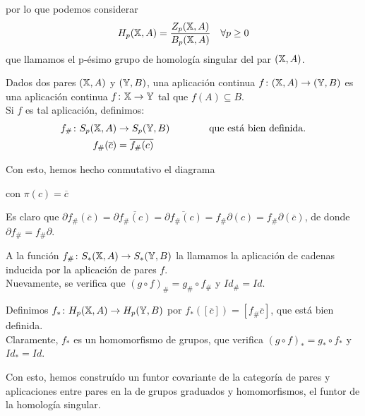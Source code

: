 por lo que podemos considerar
\[H_p({\mathbb X}, A) = \frac{Z_p({\mathbb X}, A)}{B_p({\mathbb X}, A)} \quad \forall p \geq 0 \]
que llamamos el p-ésimo grupo de homología singular del par $({\mathbb X}, A)$.

Dados dos pares $({\mathbb X}, A)$ y $({\mathbb Y}, B)$, una aplicación continua $f \colon ({\mathbb X}, A) \to ({\mathbb Y}, B)$ es una aplicación continua
$f \colon {\mathbb X} \to {\mathbb Y}$ tal que $f(A) \subseteq B$. \\
Si $f$ es tal aplicación, definimos:
\begin{align*}
  f_\# \colon S_p({\mathbb X}, A) &\to S_p({\mathbb Y}, B) \hspace{4em} \text{que está bien definida.} \\
  f_\#(\overline{c}) &= \overline{f_\#(c)}
\end{align*}

Con esto, hemos hecho conmutativo el diagrama \\
\hspace{2em} con $\pi(c) = \overline{c}$

Es claro que $\partial f_\#(\overline{c}) = \partial \overline{f_\#(c)} = \overline{\partial f_\#(c)} = f_\# \partial(c) = f_\# \partial(\overline{c})$,
de donde $\partial f_\# = f_\# \partial$.

A la función $f_\# \colon S_*({\mathbb X}, A) \to S_*({\mathbb Y}, B)$ la llamamos la aplicación de cadenas inducida por la aplicación de pares $f$. \\
Nuevamente, se verifica que $(g \circ f)_\# = g_\# \circ f_\#$ y $Id_\# = Id$.

Definimos $f_* \colon H_p({\mathbb X}, A) \to H_p({\mathbb Y}, B)$ por $f_*([\overline{c}]) = [f_\# \overline{c}]$, que está bien definida. \\
Claramente, $f_*$ es un homomorfismo de grupos, que verifica $(g \circ f)_* = g_* \circ f_*$ y $Id_* = Id$.

Con esto, hemos construído un funtor covariante de la categoría de pares y aplicaciones entre pares en la de grupos graduados y homomorfismos,
el funtor de la homología singular.


